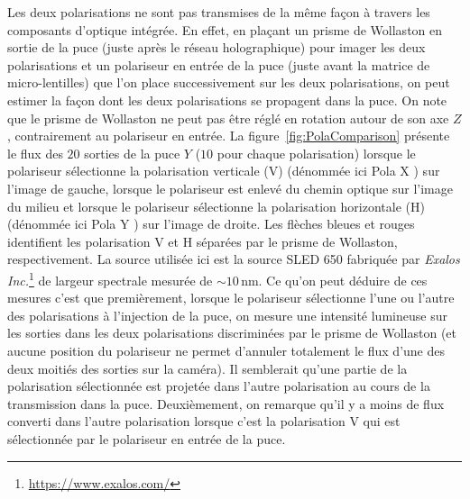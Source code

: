 Les deux polarisations ne sont pas transmises de la même façon à travers les composants d'optique intégrée. En effet, en plaçant un prisme de Wollaston en sortie de la puce (juste après le réseau holographique) pour imager les deux polarisations et un polariseur en entrée de la puce (juste avant la matrice de micro-lentilles) que l'on place successivement sur les deux polarisations, on peut estimer la façon dont les deux polarisations se propagent dans la puce. On note que le prisme de Wollaston ne peut pas être réglé en rotation autour de son axe $Z$, contrairement au polariseur en entrée. La figure~\ref{fig:PolaComparison} présente le flux des $20$ sorties de la puce $Y$ ($10$ pour chaque polarisation) lorsque le polariseur sélectionne la polarisation verticale (V) (dénommée ici \og Pola X \fg) sur l'image de gauche, lorsque le polariseur est enlevé du chemin optique sur l'image du milieu et lorsque le polariseur sélectionne la polarisation horizontale (H) (dénommée ici \og Pola Y \fg) sur l'image de droite. Les flèches bleues et rouges identifient les polarisation V et H séparées par le prisme de Wollaston, respectivement. La source utilisée ici est la source SLED 650 fabriquée par \textit{Exalos Inc.}\footnote{\url{https://www.exalos.com/}} de largeur spectrale mesurée de $\sim 10 \,$nm. Ce qu'on peut déduire de ces mesures c'est que premièrement, lorsque le polariseur sélectionne l'une ou l'autre des polarisations à l'injection de la puce, on mesure une intensité lumineuse sur les sorties dans les deux polarisations discriminées par le prisme de Wollaston (et aucune position du polariseur ne permet d'annuler totalement le flux d'une des deux moitiés des sorties sur la caméra). Il semblerait qu'une partie de la polarisation sélectionnée est projetée dans l'autre polarisation au cours de la transmission dans la puce. Deuxièmement, on remarque qu'il y a moins de flux converti dans l'autre polarisation lorsque c'est la polarisation V qui est sélectionnée par le polariseur en entrée de la puce.

